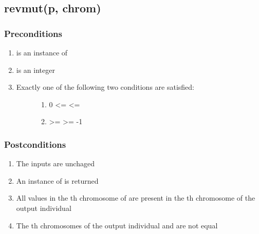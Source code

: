 \documentclass[letterpaper,10pt,english]{sphinxmanual}
\begin{document}
\subsection{revmut(p, chrom)}
\label{contracts:revmut-p-chrom}

\subsubsection{Preconditions}
\label{contracts:id43}\begin{enumerate}
\item {} 
 is an instance of 

\item {} 
 is an integer

\item {} \begin{description}
\item[{Exactly one of the following two conditions are satisfied:}] \leavevmode\begin{enumerate}
\item {} 
0 \textless{}=  \textless{}= 

\item {} 
 \textgreater{}=  \textgreater{}= -1

\end{enumerate}

\end{description}

\end{enumerate}


\subsubsection{Postconditions}
\label{contracts:id44}\begin{enumerate}
\item {} 
The inputs are unchaged

\item {} 
An instance of  is returned

\item {} 
All values in the  th chromosome of  are present in the  th chromosome of the output individual

\item {} 
The  th chromosomes of the output individual and  are not equal

\end{enumerate}
\end{document}
